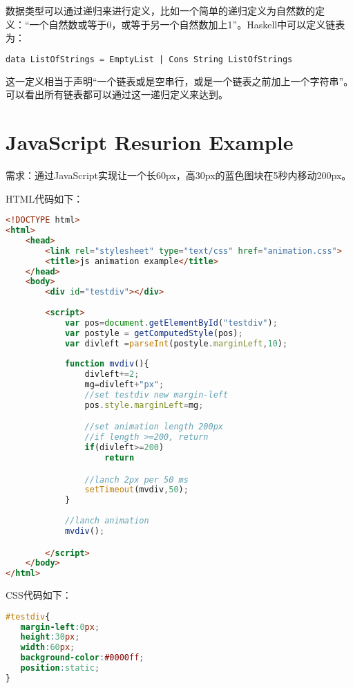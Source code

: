 数据类型可以通过递归来进行定义，比如一个简单的递归定义为自然数的定义：“一个自然数或等于0，或等于另一个自然数加上1”。Haskell中可以定义链表为：



\begin{lstlisting}[language=Scheme]
data ListOfStrings = EmptyList | Cons String ListOfStrings
\end{lstlisting}

这一定义相当于声明“一个链表或是空串行，或是一个链表之前加上一个字符串”。可以看出所有链表都可以通过这一递归定义来达到。


\section{JavaScript Resurion Example}


需求：通过JavaScript实现让一个长60px，高30px的蓝色图块在5秒内移动200px。

HTML代码如下：




\begin{lstlisting}[language=HTML]
<!DOCTYPE html>
<html>
	<head>
		<link rel="stylesheet" type="text/css" href="animation.css">
		<title>js animation example</title>
	</head>
	<body>
		<div id="testdiv"></div>
		
		<script>
			var pos=document.getElementById("testdiv");
			var postyle = getComputedStyle(pos);
			var divleft =parseInt(postyle.marginLeft,10);
			
			function mvdiv(){	
				divleft+=2;
				mg=divleft+"px";
				//set testdiv new margin-left 
				pos.style.marginLeft=mg;

				//set animation length 200px
				//if length >=200, return
				if(divleft>=200)
					return

				//lanch 2px per 50 ms 
				setTimeout(mvdiv,50);
			}
			
			//lanch animation
			mvdiv();			

		</script>
	</body>
</html>
\end{lstlisting}

CSS代码如下：

\begin{lstlisting}[language=CSS]
#testdiv{
   margin-left:0px;
   height:30px;
   width:60px;
   background-color:#0000ff;
   position:static;
}
\end{lstlisting}



















